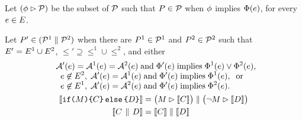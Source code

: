\begin{definition}
  Let $(\phi \mathbin\rhd \mathcal{P})$ be the subset of $\mathcal{P}$ such that
  $P\in\mathcal{P}$ when $\phi$ implies $\Phi(e)$, for every
  $e\in E$. %

  Let $P' \in (\mathcal{P}^1 \parallel \mathcal{P}^2)$
when there are $P^1 \in \mathcal{P}^1$ and $P^2 \in \mathcal{P}^2$ such that
  $E' = E^1 \cup E^2$,
  ${\le'}\supseteq{\le^1}\cup{\le^2}$, and
  either
  \begin{gather*}
  \begin{aligned}
    \;\;&\mathcal{A}'(e) = \mathcal{A}^1(e) = \mathcal{A}^2(e) \;\allowbreak\text{and}\allowbreak\; \Phi'(e) \; \allowbreak\text{implies}\allowbreak\; \Phi^1(e) \lor \Phi^2(e),\\[-1ex]
    &\;\;e \not\in E^2,\; \mathcal{A}'(e) = \mathcal{A}^1(e) \;\allowbreak\text{and}\allowbreak\; \Phi'(e) \; \allowbreak\text{implies}\allowbreak\; \Phi^1(e),\; \; \allowbreak\text{or}\allowbreak\;\\[-1ex]
    &\;\;e \not\in E^1,\; \mathcal{A}'(e) = \mathcal{A}^2(e) \;\allowbreak\text{and}\allowbreak\; \Phi'(e) \; \allowbreak\text{implies}\allowbreak\; \Phi^2(e).
  \end{aligned}
  \\
\begin{aligned}
  \llbracket\texttt{if}\allowbreak\texttt{(}M\texttt{)} \allowbreak\texttt{\{} C \texttt{\}}\,\allowbreak\texttt{else}\allowbreak\,\texttt{\{} D \texttt{\}}\rrbracket & =
  \bigl(M \mathbin\rhd \llbracket C\rrbracket\bigr) \parallel \bigl(\lnot M \mathbin\rhd \llbracket D\rrbracket\bigr) 
  \\
  \llbracket C \,\mathbin{\|}\, D\rrbracket & =
  \llbracket C\rrbracket \parallel \llbracket D\rrbracket 
\end{aligned}
\end{gather*}
\end{definition}


